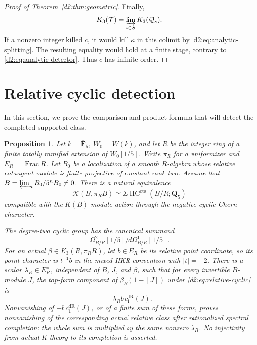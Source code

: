 \documentclass[11pt,a4paper]{amsart}
\numberwithin{equation}{section}
\newtheorem{proposition}[theorem]{Proposition}
\theoremstyle{definition}
\theoremstyle{remark}
\newcommand{\DtwoQQ}{\mathbf{Q}}
\newcommand{\DtwoFF}{\mathbf{F}}
\newcommand{\DtwocK}{\mathcal K}
\newcommand{\DtwocQ}{\mathcal Q}
\newcommand{\DtwocT}{\mathcal T}
\newcommand{\DtwodR}{\mathrm{dR}}
\newcommand{\Dtwocts}{\mathrm{cts}}
\DeclareMathOperator{\DtwoFrac}{Frac}
\DeclareMathOperator{\DtwoHC}{HC}
\begin{document}
\begin{proof}[Proof of Theorem~\ref{d2:thm:geometric}]
Finally,
\[
 K_3(\DtwocT)=\varinjlim_{s\in S}K_3(\DtwocQ_s).
\]
If a nonzero integer killed \(c\), it would kill \(\kappa\) in this
colimit by \eqref{d2:eq:analytic-splitting}.
The resulting equality would hold at a finite stage, contrary to
\eqref{d2:eq:analytic-detector}. Thus \(c\) has infinite order.
\end{proof}

\section{Relative cyclic detection}\label{d2:sec:cyclic}

In this section, we prove the comparison and product formula that will
detect the completed supported class.

\begin{proposition}\label{d2:prop:cyclic}
Let \(k=\overline{\DtwoFF}_5\), \(W_0=W(k)\), and let \(R\) be the
integer ring of a finite totally ramified extension of \(W_0[1/5]\).
Write \(\pi_R\) for a uniformizer and \(E_R=\DtwoFrac R\).
Let \(B_0\) be a localization of a smooth \(R\)-algebra whose relative
cotangent module is finite projective of constant rank two.
Assume that \(B=\varprojlim_nB_0/5^nB_0\ne0\).
There is a natural equivalence
\begin{equation}\label{d2:eq:relative-cyclic}
 \DtwocK(B,\pi_RB)\simeq\Sigma\DtwoHC^\Dtwocts(B/R;\DtwoQQ_5)
\end{equation}
compatible with the \(K(B)\)-module action through the negative cyclic
Chern character.

The degree-two cyclic group has the canonical summand
\[
 \Omega^2_{B/R}[1/5]\big/d\Omega^1_{B/R}[1/5].
\]
For an actual \(\beta\in K_3(R,\pi_RR)\), let \(b\in E_R\) be its
relative point coordinate, so its point character is \(t^{-1}b\)
in the mixed-HKR convention with \(|t|=-2\).
There is a scalar \(\lambda_R\in E_R^\times\), independent of
\(B\), \(J\), and \(\beta\), such that for every invertible
\(B\)-module \(J\), the top-form component of
\(\beta_B(1-[J])\) under \eqref{d2:eq:relative-cyclic} is
\[
 -\lambda_R b\,c_1^\DtwodR(J).
\]
Nonvanishing of \(-b\,c_1^\DtwodR(J)\), or of a finite sum of
these forms, proves nonvanishing of the corresponding actual
relative class after rationalized spectral completion: the whole
sum is multiplied by the same nonzero \(\lambda_R\).
No injectivity from actual K-theory to its completion is asserted.
\end{proposition}
\end{document}
